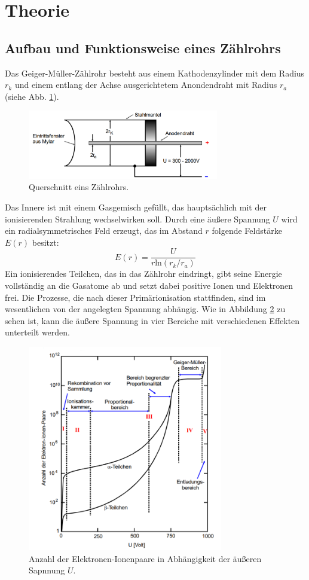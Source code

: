 \section{Theorie}
\label{sec:Theorie}

\subsection{Aufbau und Funktionsweise eines Zählrohrs}

Das Geiger-Müller-Zählrohr besteht aus einem Kathodenzylinder mit dem Radius $r_k$ und einem entlang der Achse ausgerichtetem Anondendraht mit Radius $r_a$ (siehe Abb. \ref{fig:Rohr}).
\begin{figure}
  \centering
  \includegraphics[height=3cm]{data/Rohr.png}
  \caption{Querschnitt eins Zählrohrs. \cite{V703}}
  \label{fig:Rohr}
\end{figure}
\FloatBarrier
Das Innere ist mit einem Gasgemisch gefüllt, das hauptsächlich mit der ionisierenden Strahlung wechselwirken soll.
Durch eine äußere Spannung $U$ wird ein radialsymmetrisches Feld erzeugt, das im Abstand $r$ folgende Feldstärke $E(r)$ besitzt:
\begin{equation}
  E(r) = \frac{U}{r \text{ln}(r_k/r_a)}
  \label{eqn:gl1s}
\end{equation}
Ein ionisierendes Teilchen, das in das Zählrohr eindringt, gibt seine Energie vollständig an die Gasatome ab und setzt dabei positive Ionen und Elektronen frei.
Die Prozesse, die nach dieser Primärionisation stattfinden, sind im wesentlichen von der angelegten Spannung abhängig.
Wie in Abbildung \ref{fig:Bereiche} zu sehen ist, kann die äußere Spannung in vier Bereiche mit verschiedenen Effekten unterteilt werden.
\begin{figure}
  \centering
  \includegraphics[height=9cm]{data/Bereiche.png}
  \caption{Anzahl der Elektronen-Ionenpaare in Abhängigkeit der äußeren Sapnnung $U$. \cite{V703}}
  \label{fig:Bereiche}
\end{figure}
